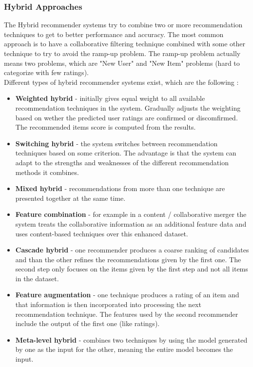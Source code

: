 \documentclass[\myFontSize,a4paper,oneside,english,hidelinks]{article}
\begin{document}
\subsubsection{Hybrid Approaches}
The Hybrid recommender systems try to combine two or more recommendation techniques to get to better performance and accuracy. The most common approach is to have a collaborative filtering technique combined with some other technique to try to avoid the ramp-up problem.
The ramp-up problem actually means two problems, which are "New User" and "New Item" problems (hard to categorize with few ratings).\\
Different types of hybrid recommender systems exist, which are the following \cite{Burke2002331}:
\begin{itemize}[label=--]
\item \textbf{Weighted hybrid} - initially gives equal weight to all available recommendation techniques in the system. Gradually adjusts the weighting based on wether the predicted user ratings are confirmed or discomfirmed. The recommended items score is computed from the results.
\item \textbf{Switching hybrid} - the system switches between recommendation techniques based on some criterion. The advantage is that the system can adapt to the strengths and weaknesses of the different recommendation methods it combines.
\item \textbf{Mixed hybrid} - recommendations from more than one technique are presented together at the same time. 
\item \textbf{Feature combination} - for example in a content / collaborative merger the system treats the collaborative information as an additional feature data and uses content-based techniques over this enhanced dataset.
\item \textbf{Cascade hybrid} - one recommender produces a coarse ranking of candidates and than the other refines the recommendations given by the first one. The second step only focuses on the items given by the first step and not all items in the dataset.
\item \textbf{Feature augmentation} - one technique produces a rating of an item and that information is then incorporated into processing the next recommendation technique. The features used by the second recommender include the output of the first one (like ratings).
\item \textbf{Meta-level hybrid} - combines two techniques by using the model generated by one as the input for the other, meaning the entire model becomes the input.\\
\end{itemize}
%
%
%
%
\end{document}
